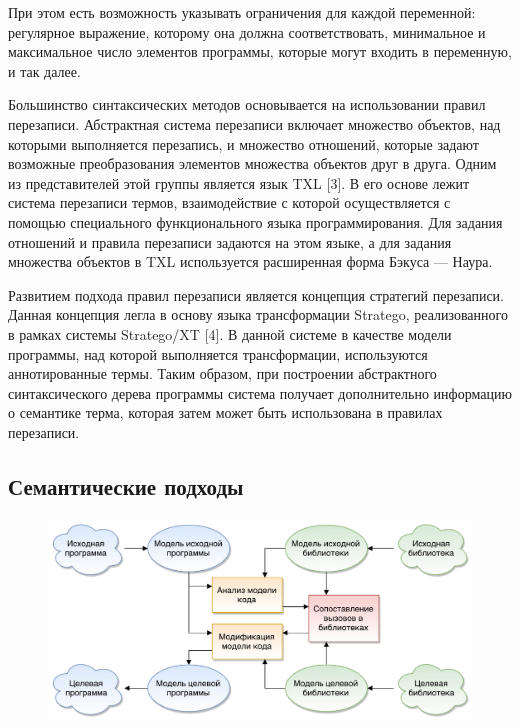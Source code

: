 При этом есть возможность указывать ограничения для каждой переменной: регулярное выражение, которому она должна соответствовать, минимальное и максимальное число элементов программы, которые могут входить в переменную, и так далее.

Большинство синтаксических методов основывается на использовании правил перезаписи. Абстрактная система перезаписи включает множество объектов, над которыми выполняется перезапись, и множество отношений, которые задают возможные преобразования элементов множества объектов друг в друга. Одним из представителей этой группы является язык TXL [3]. В его основе лежит система перезаписи термов, взаимодействие с которой осуществляется с помощью специального функционального языка программирования. Для задания отношений и правила перезаписи задаются на этом языке, а для задания множества объектов в TXL используется расширенная форма Бэкуса — Наура.

Развитием подхода правил перезаписи является концепция стратегий перезаписи. Данная концепция легла в основу языка трансформации Stratego, реализованного в рамках системы Stratego/XT [4]. В данной системе в качестве модели программы, над которой выполняется трансформации, используются аннотированные термы. Таким образом, при построении абстрактного синтаксического дерева программы система получает дополнительно информацию о семантике терма, которая затем может быть использована в правилах перезаписи.

\subsection{Семантические подходы}
\begin{figure}[htbp]
	\centering
	\includegraphics[width=\textwidth]{scheme.pdf}
	\caption{}
\end{figure}

